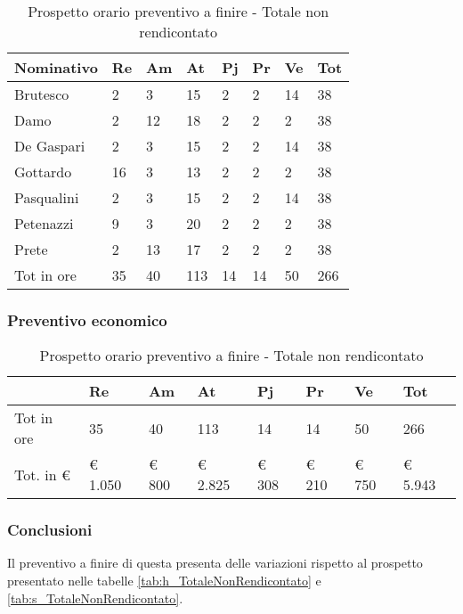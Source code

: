 			\begin{table}[H] \begin{center} \begin{tabular}{llllllll}
			\toprule
			\textbf{Nominativo}	&	\textbf{Re}	&	\textbf{Am}	&	\textbf{At}	&	\textbf{Pj}	&	\textbf{Pr}	&	\textbf{Ve}	&	\textbf{Tot}	 \\
			\midrule
			Brutesco	&	2	&	3	&	15	&	2	&	2	&	14	&	38	 \\
			Damo	&	2	&	12	&	18	&	2	&	2	&	2	&	38	 \\
			De Gaspari	&	2	&	3	&	15	&	2	&	2	&	14	&	38	 \\
			Gottardo	&	16	&	3	&	13	&	2	&	2	&	2	&	38	 \\
			Pasqualini	&	2	&	3	&	15	&	2	&	2	&	14	&	38	 \\
			Petenazzi	&	9	&	3	&	20	&	2	&	2	&	2	&	38	 \\
			Prete	&	2	&	13	&	17	&	2	&	2	&	2	&	38	 \\
			\midrule
			Tot in ore	&	35	&	40	&	113	&	14	&	14	&	50	&	266	 \\


			\bottomrule
			\end{tabular} \end{center} \caption{Prospetto orario preventivo a finire -
			Totale non rendicontato
			} \end{table}

		\subsubsection{Preventivo economico}

			\begin{table}[H] \begin{center} \begin{tabular}{llllllll}
			\toprule
				&	\textbf{Re}	&	\textbf{Am}	&	\textbf{At}	&	\textbf{Pj}	&	\textbf{Pr}	&	\textbf{Ve}	&	\textbf{Tot}	 \\
			\midrule
			Tot in ore	&	35	&	40	&	113	&	14	&	14	&	50	&	266	 \\
			Tot. in €	&	 €  1.050 	 & 	 €  800	 & 	 €  2.825	 & 	 €  308 	 & 	 €  210 & 	 €  750	 & 	 €        5.943 	 \\			\bottomrule
			\end{tabular} \end{center}
			\caption{Prospetto orario preventivo a finire - Totale non rendicontato
			} \end{table}

	\subsubsection{Conclusioni} Il preventivo a finire di questa  presenta delle variazioni rispetto al prospetto presentato nelle tabelle \ref{tab:h_TotaleNonRendicontato} e \ref{tab:s_TotaleNonRendicontato}.

